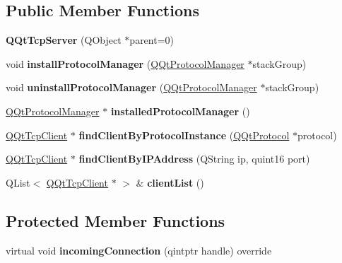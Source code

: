 \subsection*{Public Member Functions}
\begin{DoxyCompactItemize}
\item 
\mbox{\label{class_q_qt_tcp_server_ad01275498bcf90745e867bac97a5592b}} 
{\bfseries Q\+Qt\+Tcp\+Server} (Q\+Object $\ast$parent=0)
\item 
\mbox{\label{class_q_qt_tcp_server_a559bf88d0859a8946f58957409882510}} 
void {\bfseries install\+Protocol\+Manager} (\mbox{\hyperlink{class_q_qt_protocol_manager}{Q\+Qt\+Protocol\+Manager}} $\ast$stack\+Group)
\item 
\mbox{\label{class_q_qt_tcp_server_ae3920f7aa15c6aa753a1cb73463f3a2b}} 
void {\bfseries uninstall\+Protocol\+Manager} (\mbox{\hyperlink{class_q_qt_protocol_manager}{Q\+Qt\+Protocol\+Manager}} $\ast$stack\+Group)
\item 
\mbox{\label{class_q_qt_tcp_server_ad3045cb1938e7d40d8e934115d69d24a}} 
\mbox{\hyperlink{class_q_qt_protocol_manager}{Q\+Qt\+Protocol\+Manager}} $\ast$ {\bfseries installed\+Protocol\+Manager} ()
\item 
\mbox{\label{class_q_qt_tcp_server_a32011b9152147c2c0dcea3b48c431fba}} 
\mbox{\hyperlink{class_q_qt_tcp_client}{Q\+Qt\+Tcp\+Client}} $\ast$ {\bfseries find\+Client\+By\+Protocol\+Instance} (\mbox{\hyperlink{class_q_qt_protocol}{Q\+Qt\+Protocol}} $\ast$protocol)
\item 
\mbox{\label{class_q_qt_tcp_server_a48da245debde693c324ba0b124dc596f}} 
\mbox{\hyperlink{class_q_qt_tcp_client}{Q\+Qt\+Tcp\+Client}} $\ast$ {\bfseries find\+Client\+By\+I\+P\+Address} (Q\+String ip, quint16 port)
\item 
\mbox{\label{class_q_qt_tcp_server_a79fa23918c5258585f31e23b55bc631a}} 
Q\+List$<$ \mbox{\hyperlink{class_q_qt_tcp_client}{Q\+Qt\+Tcp\+Client}} $\ast$ $>$ \& {\bfseries client\+List} ()
\end{DoxyCompactItemize}
\subsection*{Protected Member Functions}
\begin{DoxyCompactItemize}
\item 
\mbox{\label{class_q_qt_tcp_server_a993a656b7adfa822fc8718409218459e}} 
virtual void {\bfseries incoming\+Connection} (qintptr handle) override
\end{DoxyCompactItemize}


